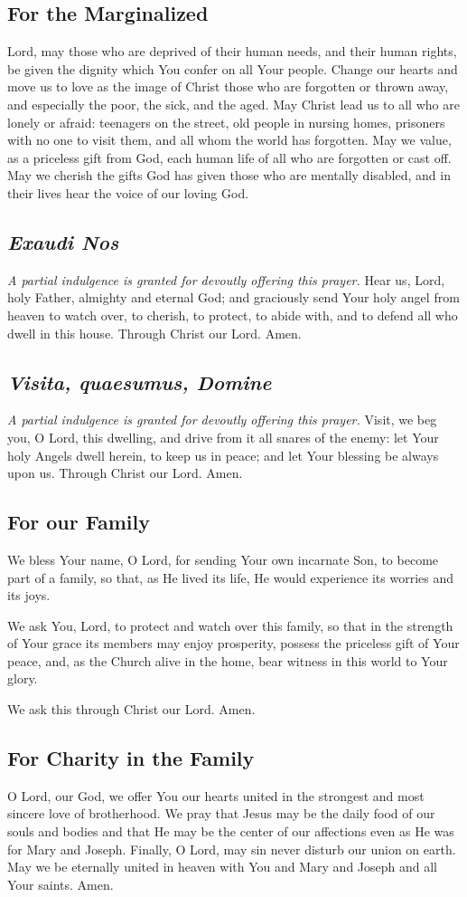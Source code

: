 \documentclass[12pt]{article}
\newcommand{\prayertitle}[1]{\subsection{#1}}
\newcommand{\indulgencedprayertitle}[1]{\prayertitle{#1 \protect\kreuz}}
\newcommand{\foreign}[1]{\textsl{#1}}
\newcommand{\note}[1]{{\small{\textsl{#1}}}\newline}
\begin{document}
\prayertitle{For the Marginalized}
Lord, may those who are deprived of their human needs, and their human rights, be given the dignity which You confer on all Your people.
Change our hearts and move us to love as the image of Christ those who are forgotten or thrown away, and especially the poor, the sick, and the aged.
May Christ lead us to all who are lonely or afraid: teenagers on the street, old people in nursing homes, prisoners with no one to visit them, and all whom the world has forgotten.
May we value, as a priceless gift from God, each human life of all who are forgotten or cast off.
May we cherish the gifts God has given those who are mentally disabled,
and in their lives hear the voice of our loving God.

\indulgencedprayertitle{\foreign{Exaudi Nos}}
\note{A partial indulgence is granted for devoutly offering this prayer.}
Hear us, Lord, holy Father, almighty and eternal God;
and graciously send Your holy angel from heaven to watch over, to cherish, to protect, to abide with, and to defend all who dwell in this house.
Through Christ our Lord. Amen.

\indulgencedprayertitle{\foreign{Visita, quaesumus, Domine}}
\note{A partial indulgence is granted for devoutly offering this prayer.}
Visit, we beg you, O Lord, this dwelling, and drive from it all snares of the enemy:
let Your holy Angels dwell herein, to keep us in peace;
and let Your blessing be always upon us.
Through Christ our Lord.
Amen.

\prayertitle{For our Family}
We bless Your name, O Lord, for sending Your own incarnate Son, to become part of a family, so that, as He lived its life, He would experience its worries and its joys.

We ask You, Lord, to protect and watch over this family, so that in the strength of Your grace its members may enjoy prosperity, possess the priceless gift of Your peace, and, as the Church alive in the home, bear witness in this world to Your glory.

We ask this through Christ our Lord.
Amen.

\prayertitle{For Charity in the Family}
O Lord, our God, we offer You our hearts united in the strongest and most sincere love of brotherhood.
We pray that Jesus may be the daily food of our souls and bodies and that He may be the center of our affections even as He was for Mary and Joseph.
Finally, O Lord, may sin never disturb our union on earth.
May we be eternally united in heaven with You and Mary and Joseph and all Your saints.
Amen.
\end{document}
